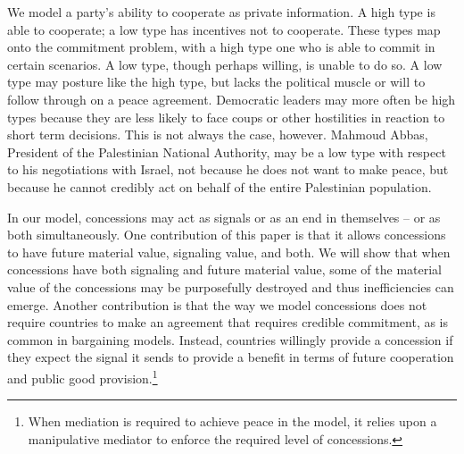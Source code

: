\documentclass[12pt, letterpaper]{article}
\begin{document}



We model a party's ability to cooperate as private information. A high type is able to cooperate; a low type has incentives not to cooperate. These types map onto the commitment problem, with a high type one who is able to commit in certain scenarios. A low type, though perhaps willing, is unable to do so. A low type may posture like the high type, but lacks the political muscle or will to follow through on a peace agreement. Democratic leaders may more often be high types because they are less likely to face coups or other hostilities in reaction to short term decisions. This is not always the case, however. Mahmoud Abbas, President of the Palestinian National Authority, may be a low type with respect to his negotiations with Israel, not because he does not want to make peace, but because he cannot credibly act on behalf of the entire Palestinian population. 

In our model, concessions may act as signals or as an end in themselves -- or as both simultaneously. One contribution of this paper is that it allows concessions to have future material value, signaling value, and both. We will show that when concessions have both signaling and future material value, some of the material value of the concessions may be purposefully destroyed and thus inefficiencies can emerge. Another contribution is that the way we model concessions does not require countries to make an agreement that requires credible commitment, as is common in bargaining models. Instead, countries willingly provide a concession if they expect the signal it sends to provide a benefit in terms of future cooperation and public good provision.\footnote{When mediation is required to achieve peace in the model, it relies upon a manipulative mediator to enforce the required level of concessions.}
\end{document}
